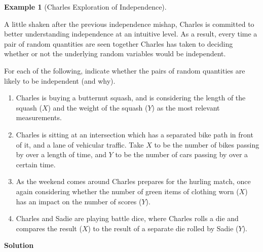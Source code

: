 \documentclass[
  letterpaper,
  DIV=11,
  numbers=noendperiod]{scrreprt}
\providecommand{\tightlist}{%
  \setlength{\itemsep}{0pt}\setlength{\parskip}{0pt}}\usepackage{longtable,booktabs,array}
\theoremstyle{definition}
\theoremstyle{definition}
\newtheorem{example}{Example}[chapter]
\theoremstyle{definition}
\theoremstyle{remark}
\begin{document}
\begin{example}[Charles Exploration of
Independence]\protect\hypertarget{exm-independence-via-pmfs}{}\label{exm-independence-via-pmfs}

A little shaken after the previous independence mishap, Charles is
committed to better understanding independence at an intuitive level. As
a result, every time a pair of random quantities are seen together
Charles has taken to deciding whether or not the underlying random
variables would be independent.

For each of the following, indicate whether the pairs of random
quantities are likely to be independent (and why).

\begin{enumerate}
\def\labelenumi{\alph{enumi}.}
\tightlist
\item
  Charles is buying a butternut squash, and is considering the length of
  the squash (\(X\)) and the weight of the squash (\(Y\)) as the most
  relevant measurements.
\item
  Charles is sitting at an intersection which has a separated bike path
  in front of it, and a lane of vehicular traffic. Take \(X\) to be the
  number of bikes passing by over a length of time, and \(Y\) to be the
  number of cars passing by over a certain time.
\item
  As the weekend comes around Charles prepares for the hurling match,
  once again considering whether the number of green items of clothing
  worn (\(X\)) has an impact on the number of scores (\(Y\)).
\item
  Charles and Sadie are playing battle dice, where Charles rolls a die
  and compares the result (\(X\)) to the result of a separate die rolled
  by Sadie (\(Y\)).
\end{enumerate}

\begin{tcolorbox}[enhanced jigsaw, colback=white, colframe=quarto-callout-color-frame, arc=.35mm, leftrule=.75mm, rightrule=.15mm, opacityback=0, breakable, bottomrule=.15mm, left=2mm, toprule=.15mm]

\vspace{-3mm}\textbf{Solution}\vspace{3mm}


\end{tcolorbox}
\end{example}
\end{document}
